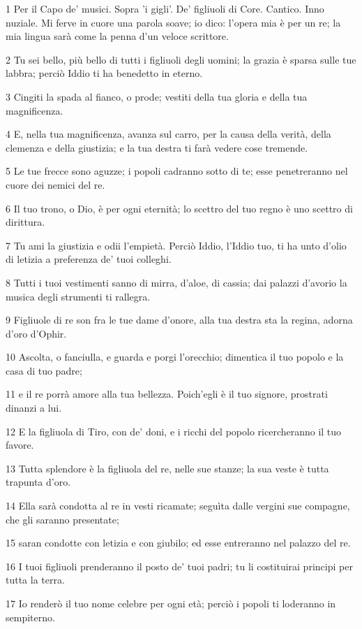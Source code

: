 \par 1 Per il Capo de' musici. Sopra 'i gigli'. De' figliuoli di Core. Cantico. Inno nuziale. Mi ferve in cuore una parola soave; io dico: l'opera mia è per un re; la mia lingua sarà come la penna d'un veloce scrittore.
\par 2 Tu sei bello, più bello di tutti i figliuoli degli uomini; la grazia è sparsa sulle tue labbra; perciò Iddio ti ha benedetto in eterno.
\par 3 Cingiti la spada al fianco, o prode; vestiti della tua gloria e della tua magnificenza.
\par 4 E, nella tua magnificenza, avanza sul carro, per la causa della verità, della clemenza e della giustizia; e la tua destra ti farà vedere cose tremende.
\par 5 Le tue frecce sono aguzze; i popoli cadranno sotto di te; esse penetreranno nel cuore dei nemici del re.
\par 6 Il tuo trono, o Dio, è per ogni eternità; lo scettro del tuo regno è uno scettro di dirittura.
\par 7 Tu ami la giustizia e odii l'empietà. Perciò Iddio, l'Iddio tuo, ti ha unto d'olio di letizia a preferenza de' tuoi colleghi.
\par 8 Tutti i tuoi vestimenti sanno di mirra, d'aloe, di cassia; dai palazzi d'avorio la musica degli strumenti ti rallegra.
\par 9 Figliuole di re son fra le tue dame d'onore, alla tua destra sta la regina, adorna d'oro d'Ophir.
\par 10 Ascolta, o fanciulla, e guarda e porgi l'orecchio; dimentica il tuo popolo e la casa di tuo padre;
\par 11 e il re porrà amore alla tua bellezza. Poich'egli è il tuo signore, prostrati dinanzi a lui.
\par 12 E la figliuola di Tiro, con de' doni, e i ricchi del popolo ricercheranno il tuo favore.
\par 13 Tutta splendore è la figliuola del re, nelle sue stanze; la sua veste è tutta trapunta d'oro.
\par 14 Ella sarà condotta al re in vesti ricamate; seguìta dalle vergini sue compagne, che gli saranno presentate;
\par 15 saran condotte con letizia e con giubilo; ed esse entreranno nel palazzo del re.
\par 16 I tuoi figliuoli prenderanno il posto de' tuoi padri; tu li costituirai principi per tutta la terra.
\par 17 Io renderò il tuo nome celebre per ogni età; perciò i popoli ti loderanno in sempiterno.

